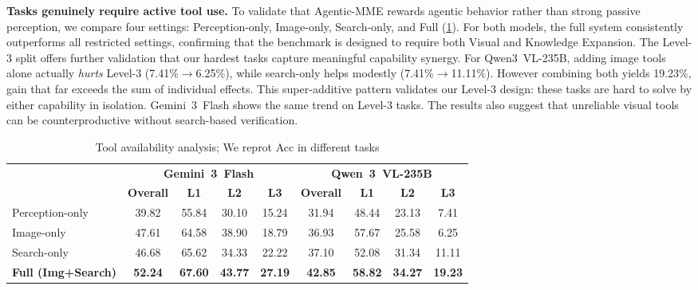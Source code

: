 \documentclass[runningheads]{llncs}
\theoremstyle{plain}
\theoremstyle{definition}
\theoremstyle{remark}
\begin{document}
\vspace{1mm}
\noindent\textbf{Tasks genuinely require active tool use.}
To validate that Agentic-MME rewards agentic behavior rather than
strong passive perception, we compare four settings:
Perception-only, Image-only, Search-only, and Full
(\cref{tab:tool_ablation}).
For both models, the full system consistently outperforms all restricted settings, confirming that the benchmark is designed to require both Visual and Knowledge
Expansion. The Level-3 split offers further validation that our hardest tasks
capture meaningful capability synergy.
For Qwen3~VL-235B, adding image tools alone actually \emph{hurts}
Level-3 (7.41\%$\to$6.25\%), while search-only helps modestly
(7.41\%$\to$11.11\%). However combining both yields 19.23\%, gain that far
exceeds the sum of individual effects. This super-additive pattern validates our Level-3 design: these tasks are hard to solve by either capability in isolation. Gemini~3~Flash shows the same trend on Level-3 tasks. The results also suggest that unreliable visual tools can be counterproductive without search-based verification.
\begin{table}[t]
\centering
\caption{Tool availability analysis; We reprot Acc in different tasks}
\vspace{-3mm}
\label{tab:tool_ablation}
\scriptsize
\setlength{\tabcolsep}{4.5pt}
\renewcommand{\arraystretch}{1.3}
\setlength{\aboverulesep}{0pt}
\setlength{\belowrulesep}{0pt}

\begin{tabular}{l cccc cccc} %
\toprule
\rowcolor{CadetBlue!20}
& \multicolumn{4}{c}{\textbf{Gemini~3~Flash}} & \multicolumn{4}{c}{\textbf{Qwen~3~VL-235B}} \\
\cmidrule(lr){2-5}\cmidrule(lr){6-9}
\rowcolor{CadetBlue!20}
\multirow{-2}{*}{\textbf{Setting}} & \textbf{Overall} & \textbf{L1} & \textbf{L2} & \textbf{L3} & \textbf{Overall} & \textbf{L1} & \textbf{L2} & \textbf{L3} \\
\midrule
Perception-only  & 39.82 & 55.84 & 30.10 & 15.24 & 31.94 & 48.44 & 23.13 &  7.41 \\
Image-only       & 47.61 & 64.58 & 38.90 & 18.79 & 36.93 & 57.67 & 25.58 &  6.25 \\
Search-only      & 46.68 & 65.62 & 34.33 & 22.22 & 37.10 & 52.08 & 31.34 & 11.11 \\
\rowcolor{customblue!20} %
\textbf{Full (Img+Search)}& \textbf{52.24} & \textbf{67.60} & \textbf{43.77} & \textbf{27.19} & \textbf{42.85} & \textbf{58.82} & \textbf{34.27} & \textbf{19.23} \\
\bottomrule
\end{tabular}
\vspace{-4mm}
\end{table}
\end{document}
